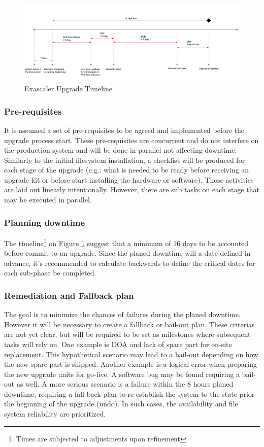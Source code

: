 \documentclass{article}
\begin{document}
\begin{figure}
    \centering
    \includegraphics[scale=0.4]{ES-upgrade-timeline.png}
    \caption{Exascaler Upgrade Timeline}
    \label{fig:es-upgrade-timeline-v2}
\end{figure}

\subsubsection{Pre-requisites}
It is assumed a set of pre-requisites to be agreed and implemented before the upgrade process start. These pre-requisites are concurrent and do not interfere on the production system and will be done in parallel not affecting downtime. Similarly to the initial filesystem installation, a checklist will be produced for each stage of the upgrade (e.g.: what is needed to be ready before receiving an upgrade kit or before start installing the hardware or software). Those activities are laid out linearly intentionally. However, there are sub tasks on each stage that may be executed in parallel.

\subsubsection{Planning downtime}
The timeline\footnote{Times are subjected to adjustments upon refinement} on Figure \ref{fig:es-upgrade-timeline-v2} suggest that a minimum of 16 days to be accounted before commit to an upgrade. Since the planed downtime will a date defined in advance, it's recommended to calculate backwards to define the critical dates for each sub-phase be completed. 

\subsubsection{Remediation and Fallback plan}
The goal is to minimize the chances of failures during the planed downtime. However it will be necessary to create a fallback or bail-out plan. These criterias are not yet clear, but will be required to be set as milestones where subsequent tasks will rely on. One example is DOA and lack of spare part for on-site replacement. This hypothetical scenario may lead to a bail-out depending on how the new spare part is shipped. Another example is a logical error when preparing the new upgrade units for go-live. A software bug may be found requiring a bail-out as well. A more serious scenario is a failure within the 8 hours planed downtime, requiring a fall-back plan to re-establish the system to the state prior the beginning of the upgrade (undo). In such cases, the availability and file system reliability are prioritized.
\end{document}
